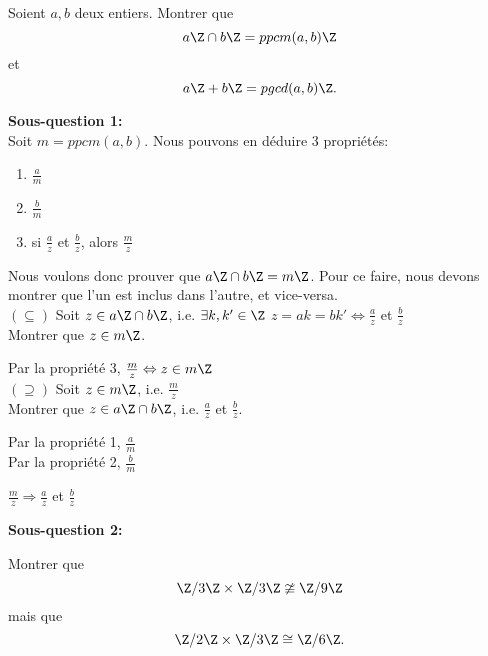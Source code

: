 
\vspace*{0.8cm}
\begin{exo}
Soient $a,b$ deux entiers. Montrer que $$a\Z \cap b\Z = ppcm(a,b)\Z$$ et $$ a\Z + b\Z = pgcd(a,b)\Z.$$
\end{exo}

\textbf{Sous-question 1:} \\

Soit $m = ppcm(a,b)$. Nous pouvons en déduire 3 propriétés:\\

\begin{enumerate}
	\item $\frac{a}{m}$
	\item $\frac{b}{m}$
	\item si $\frac{a}{z}$ et $\frac{b}{z}$, alors $\frac{m}{z}$ \\
\end{enumerate}

Nous voulons donc prouver que $a\Z \cap b\Z = m\Z$. Pour ce faire, nous devons montrer que l'un est inclus dans l'autre, et vice-versa. \\

$(\subseteq)$ Soit $z \in a\Z \cap b\Z $, i.e. $\exists k,{k}' \in \Z $ \hspace{1cm} $z = ak = b{k}' \Leftrightarrow \frac{a}{z}$ et $\frac{b}{z}$ \\

Montrer que $z \in m\Z$. 

Par la propriété 3, $\frac{m}{z} \Leftrightarrow z \in m\Z$ \\

$(\supseteq)$ Soit $z \in m\Z $, i.e. $\frac{m}{z}$ \\

Montrer que $z \in a\Z \cap b\Z$, i.e. $\frac{a}{z}$ et $\frac{b}{z}$. \\

\begin{minipage}{.5\textwidth}
	Par la propriété 1, $\frac{a}{m}$\\

	Par la propriété 2, $\frac{b}{m}$\\
\end{minipage}
\begin{minipage}{.5\textwidth}
	$\frac{m}{z} \Rightarrow \frac{a}{z}$ et $\frac{b}{z}$ \\
\end{minipage}

\vspace*{0.3cm}

\textbf{Sous-question 2:} \\

\vspace*{0.8cm}


\begin{exo}
Montrer que $$\Z/3\Z \times \Z/3\Z \ncong \Z/9\Z$$ mais que $$\Z/2\Z \times \Z/3\Z \cong \Z/6\Z.$$

\end{exo}